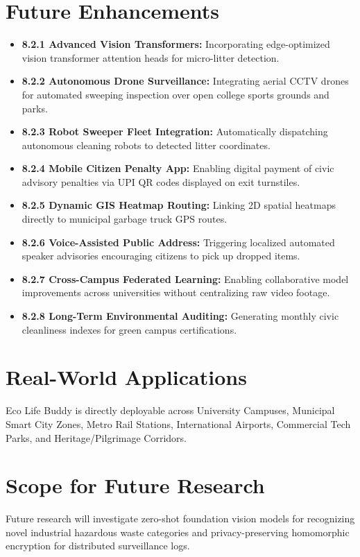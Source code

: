 \documentclass[12pt,a4paper]{report}
\begin{document}
\section{Future Enhancements}
\begin{itemize}
\item \textbf{8.2.1 Advanced Vision Transformers:} Incorporating edge-optimized vision transformer attention heads for micro-litter detection.
\item \textbf{8.2.2 Autonomous Drone Surveillance:} Integrating aerial CCTV drones for automated sweeping inspection over open college sports grounds and parks.
\item \textbf{8.2.3 Robot Sweeper Fleet Integration:} Automatically dispatching autonomous cleaning robots to detected litter coordinates.
\item \textbf{8.2.4 Mobile Citizen Penalty App:} Enabling digital payment of civic advisory penalties via UPI QR codes displayed on exit turnstiles.
\item \textbf{8.2.5 Dynamic GIS Heatmap Routing:} Linking 2D spatial heatmaps directly to municipal garbage truck GPS routes.
\item \textbf{8.2.6 Voice-Assisted Public Address:} Triggering localized automated speaker advisories encouraging citizens to pick up dropped items.
\item \textbf{8.2.7 Cross-Campus Federated Learning:} Enabling collaborative model improvements across universities without centralizing raw video footage.
\item \textbf{8.2.8 Long-Term Environmental Auditing:} Generating monthly civic cleanliness indexes for green campus certifications.
\end{itemize}

\section{Real-World Applications}
Eco Life Buddy is directly deployable across University Campuses, Municipal Smart City Zones, Metro Rail Stations, International Airports, Commercial Tech Parks, and Heritage/Pilgrimage Corridors.

\section{Scope for Future Research}
Future research will investigate zero-shot foundation vision models for recognizing novel industrial hazardous waste categories and privacy-preserving homomorphic encryption for distributed surveillance logs.
\end{document}
